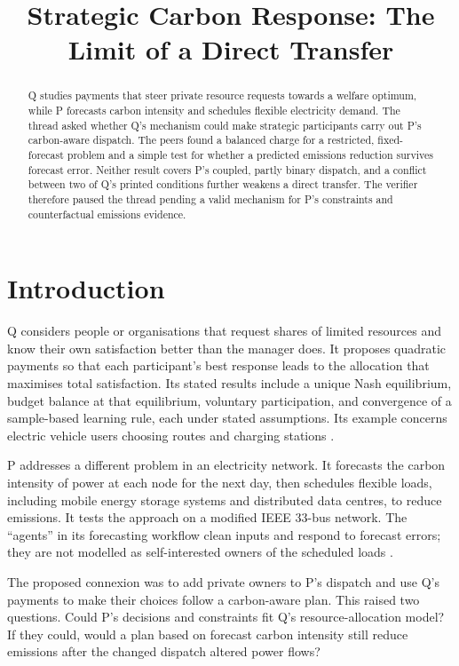 \documentclass{article}
\title{Strategic Carbon Response: The Limit of a Direct Transfer}
\begin{document}
\maketitle

\begin{abstract}
Q studies payments that steer private resource requests towards a welfare optimum, while P forecasts
carbon intensity and schedules flexible electricity demand. The thread asked whether Q's mechanism could
make strategic participants carry out P's carbon-aware dispatch. The peers found a balanced charge for a
restricted, fixed-forecast problem and a simple test for whether a predicted emissions reduction survives
forecast error. Neither result covers P's coupled, partly binary dispatch, and a conflict between two of
Q's printed conditions further weakens a direct transfer. The verifier therefore paused the thread
pending a valid mechanism for P's constraints and counterfactual emissions evidence.
\end{abstract}

\section{Introduction}

Q considers people or organisations that request shares of limited resources and know their own
satisfaction better than the manager does. It proposes quadratic payments so that each participant's best
response leads to the allocation that maximises total satisfaction. Its stated results include a unique
Nash equilibrium, budget balance at that equilibrium, voluntary participation, and convergence of a
sample-based learning rule, each under stated assumptions. Its example concerns electric vehicle users
choosing routes and charging stations \cite{Q}.

P addresses a different problem in an electricity network. It forecasts the carbon intensity of power at
each node for the next day, then schedules flexible loads, including mobile energy storage systems and
distributed data centres, to reduce emissions. It tests the approach on a modified IEEE 33-bus network.
The ``agents'' in its forecasting workflow clean inputs and respond to forecast errors; they are not
modelled as self-interested owners of the scheduled loads \cite{P}.

The proposed connexion was to add private owners to P's dispatch and use Q's payments to make their
choices follow a carbon-aware plan. This raised two questions. Could P's decisions and constraints fit
Q's resource-allocation model? If they could, would a plan based on forecast carbon intensity still
reduce emissions after the changed dispatch altered power flows?
\end{document}
